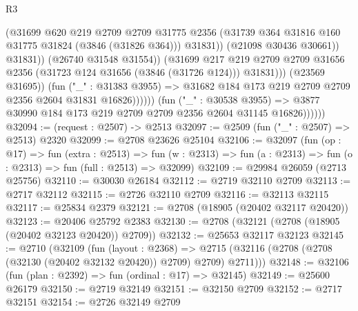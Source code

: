 \begin{lexlean}{R3}
\begin{coremodule}
                                        (@31699
                                          @620
                                          @219
                                          @2709
                                          @2709
                                          @31775
                                          @2356
                                          (@31739
                                            @364
                                            @31816
                                            @160
                                            @31775
                                            @31824
                                            (@3846 (@31826 @364)))
                                          @31831))
                                      (@21098 @30436 @30661))
                                    @31831))
                                (@26740 @31548 @31554))
                              (@31699
                                @217
                                @219
                                @2709
                                @2709
                                @31656
                                @2356
                                (@31723 @124 @31656 (@3846 (@31726 @124)))
                                @31831)))
                          (@23569 @31695))
                        (fun ("_" : @31383 @3955) =>
                        @31682 @184 @173 @219 @2709 @2709 @2356 @2604 @31831 @16826))))))
              (fun ("_" : @30538 @3955) =>
              @3877 @30990 @184 @173 @219 @2709 @2709 @2356 @2604 @31145 @16826))))))
@32094 := (request : @2507) -> @2513
@32097 := @2509 (fun ("_" : @2507) => @2513) @2320
@32099 := @2708 @23626 @25104
@32106 := @32097
    (fun (op : @17) =>
    fun (extra : @2513) =>
    fun (w : @2313) => fun (a : @2313) => fun (o : @2313) => fun (full : @2513) => @32099)
@32109 := @29984 @26059 (@2713 @25756)
@32110 := @30030 @26184
@32112 := @2719 @32110 @2709
@32113 := @2717 @32112
@32115 := @2726 @32110 @2709
@32116 := @32113 @32115
@32117 := @25834 @2379
@32121 := @2708 (@18905 (@20402 @32117 @20420))
@32123 := @20406 @25792 @2383
@32130 := @2708 (@32121 (@2708 (@18905 (@20402 @32123 @20420)) @2709))
@32132 := @25653 @32117 @32123
@32145 := @2710
    (@32109
      (fun (layout : @2368) =>
      @2715 (@32116 (@2708 (@2708 (@32130 (@20402 @32132 @20420)) @2709) @2709) @2711)))
@32148 := @32106 (fun (plan : @2392) => fun (ordinal : @17) => @32145)
@32149 := @25600 @26179
@32150 := @2719 @32149
@32151 := @32150 @2709
@32152 := @2717 @32151
@32154 := @2726 @32149 @2709

\end{coremodule}
\end{lexlean}
